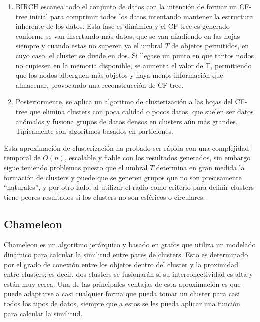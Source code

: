 \documentclass[10pt, a4paper]{article}
\begin{document}
\begin{enumerate}
  \item BIRCH escanea todo el conjunto de datos con la intención de formar un CF-tree inicial para comprimir todos los datos intentando mantener la estructura inherente de los datos. Esta fase es dinámica y el CF-tree es generado conforme se van insertando más datos, que se van añadiendo en las hojas siempre y cuando estas no superen ya el umbral $T$ de objetos permitidos, en cuyo caso, el cluster se divide en dos. Si llegase un punto en que tantos nodos no cupiesen en la memoria disponible, se aumenta el valor de T, permitiendo que los nodos alberguen más objetos y haya menos información que almacenar, provocando una reconstrucción de CF-tree.
  \item Posteriormente, se aplica un algoritmo de clusterización a las hojas del CF-tree que elimina clusters con poca calidad o pocos datos, que suelen ser datos anómalos y fusiona grupos de datos densos en clusters aún más grandes. Típicamente son algoritmos basados en particiones.
\end{enumerate}

Esta aproximación de clusterización ha probado ser rápida con una complejidad temporal de $O\left(n \right)$, escalable y fiable con los resultados generados, sin embargo sigue teniendo problemas puesto que el umbral $T$ determina en gran medida la formación de clusters y puede que se generen grupos que no son precisamente ``naturales'', y por otro lado, al utilizar el radio como criterio para definir clusters tiene peores resultados si los clusters no son esféricos o circulares.




\subsection{\textbf{Chameleon}} \label{subsec:Chameleon}


\cite{chameleon} Chameleon es un algoritmo jerárquico y basado en grafos que utiliza un modelado dinámico para calcular la similitud entre pares de clusters. Esto es determinado por el grado de conexión entre los objetos dentro del cluster y la proximidad entre clusters; es decir, dos clusters se fusionarán si su interconectividad es alta y están muy cerca. Una de las principales ventajas de esta aproximación es que puede adaptarse a casi cualquier forma que pueda tomar un cluster para casi todos los tipos de datos, siempre que a estos se les pueda aplicar una función para calcular la similitud.
\end{document}
